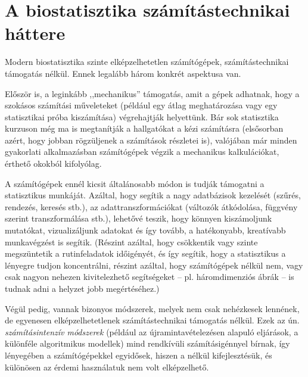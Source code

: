 \documentclass[]{book}
\begin{document}
\section{A biostatisztika számítástechnikai
háttere}\label{alapokszamtech}

Modern biostatisztika szinte elképzelhetetlen számítógépek,
számítástechnikai támogatás nélkül. Ennek legalább három konkrét
aspektusa van.

Először is, a leginkább ,,mechanikus'' támogatás, amit a gépek adhatnak,
hogy a szokásos számítási műveleteket (például egy átlag meghatározása
vagy egy statisztikai próba kiszámítása) végrehajtják helyettünk. Bár
sok statisztika kurzuson még ma is megtanítják a hallgatókat a kézi
számításra (elsősorban azért, hogy jobban rögzüljenek a számítások
részletei is), valójában már minden gyakorlati alkalmazásban
számítógépek végzik a mechanikus kalkulációkat, érthető okokból
kifolyólag.

A számítógépek ennél kicsit általánosabb módon is tudják támogatni a
statisztikus munkáját. Azáltal, hogy segítik a nagy adatbázisok
kezelését (szűrés, rendezés, keresés stb.), az adattranszformációkat
(változók átkódolása, függvény szerint transzformálása stb.), lehetővé
teszik, hogy könnyen kiszámoljunk mutatókat, vizualizáljunk adatokat és
így tovább, a hatékonyabb, kreatívabb munkavégzést is segítik. (Részint
azáltal, hogy csökkentik vagy szinte megszüntetik a rutinfeladatok
időigényét, és így segítik, hogy a statisztikus a lényegre tudjon
koncentrálni, részint azáltal, hogy számítógépek nélkül nem, vagy csak
nagyon nehezen kivitelezhető segítségeket -- pl. háromdimenziós ábrák --
is tudnak adni a helyzet jobb megértéséhez.)

Végül pedig, vannak bizonyos módszerek, melyek nem csak nehézkesek
lennének, de egyenesen elképzelhetetlenek számítástechnikai támogatás
nélkül. Ezek az ún. \emph{számításintenzív módszerek} (például az
újramintavételezésen alapuló eljárások, a különféle algoritmikus
modellek) mind rendkívüli számításigénnyel bírnak, így lényegében a
számítógépekkel egyidősek, hiszen a nélkül kifejlesztésük, és különösen
az érdemi használatuk nem volt elképzelhető.
\end{document}
